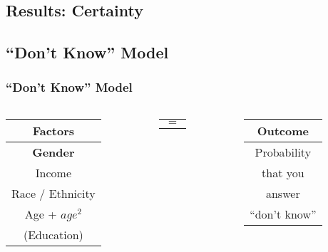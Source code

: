 \documentclass[pdf]{beamer}
\begin{document}
\subsection{Results: Certainty}

\subsection{``Don't Know'' Model}
\begin{frame}
\frametitle{``Don't Know'' Model}
  \begin{columns}

    \begin{column}{0.25\textwidth}
       \begin{tabular}{c}  %
         \hline   %
         Factors          \\
         \hline   %
         \textbf{Gender}           \\
         Income           \\
         Race / Ethnicity \\
         Age + $age^2$    \\
         (Education)        \\
         \hline  %
         \end{tabular}
    \end{column}

    \begin{column}{0.05\textwidth}
      \begin{tabular}{c}
        \LARGE{$ = $}
      \end{tabular}
    \end{column}

    \begin{column}{0.2\textwidth}
       \begin{tabular}{c}  %
         \hline   %
         Outcome        \\
         \hline   %
         Probability      \\
         that you        \\
         answer        \\
         ``don't know'' \\
         \hline  %
      \end{tabular}
    \end{column}


\end{columns}
\end{frame}
\end{document}
